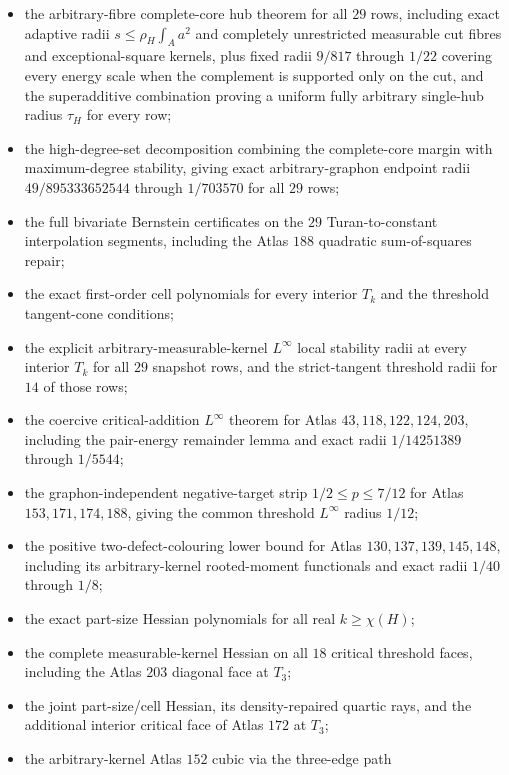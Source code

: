 \documentclass[11pt]{article}
\begin{document}
\begin{itemize}
 $0\leq s\leq1/3$, $0\leq a,r\leq1$;
 \item the arbitrary-fibre complete-core hub theorem for all $29$ rows,
 including exact adaptive radii $s\leq\rho_H\int_Aa^2$ and completely
 unrestricted measurable cut fibres and exceptional-square kernels, plus
 fixed radii $9/817$ through $1/22$ covering every energy scale when the
 complement is supported only on the cut, and the superadditive combination
 proving a uniform fully arbitrary single-hub radius $\tau_H$ for every row;
 \item the high-degree-set decomposition combining the complete-core margin
 with maximum-degree stability, giving exact arbitrary-graphon endpoint
 radii $49/895333652544$ through $1/703570$ for all $29$ rows;
 \item the full bivariate Bernstein certificates on the $29$
 Turan-to-constant interpolation segments, including the Atlas $188$
 quadratic sum-of-squares repair;
 \item the exact first-order cell polynomials for every interior $T_k$ and the
 threshold tangent-cone conditions;
 \item the explicit arbitrary-measurable-kernel $L^\infty$ local stability
  radii at every interior $T_k$ for all $29$ snapshot rows, and the
  strict-tangent threshold radii for $14$ of those rows;
 \item the coercive critical-addition $L^\infty$ theorem for Atlas
  $43,118,122,124,203$, including the pair-energy remainder lemma and exact
  radii $1/14251389$ through $1/5544$;
 \item the graphon-independent negative-target strip
  $1/2\leq p\leq7/12$ for Atlas $153,171,174,188$, giving the common
  threshold $L^\infty$ radius $1/12$;
 \item the positive two-defect-colouring lower bound for Atlas
  $130,137,139,145,148$, including its arbitrary-kernel rooted-moment
  functionals and exact radii $1/40$ through $1/8$;
 \item the exact part-size Hessian polynomials for all real
 $k\geq\chi(H)$;
 \item the complete measurable-kernel Hessian on all $18$ critical threshold
 faces, including the Atlas $203$ diagonal face at $T_3$;
 \item the joint part-size/cell Hessian, its density-repaired quartic rays,
 and the additional interior critical face of Atlas $172$ at $T_3$;
 \item the arbitrary-kernel Atlas $152$ cubic via the three-edge path

\end{itemize}
\end{document}
